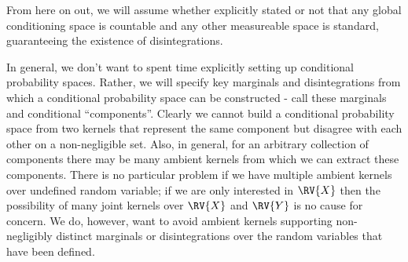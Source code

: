 From here on out, we will assume whether explicitly stated or not that any global conditioning space is countable and any other measureable space is standard, guaranteeing the existence of disintegrations.

In general, we don't want to spent time explicitly setting up conditional probability spaces. Rather, we will specify key marginals and disintegrations from which a conditional probability space can be constructed - call these marginals and conditional ``components''. Clearly we cannot build a conditional probability space from two kernels that represent the same component but disagree with each other on a non-negligible set. Also, in general, for an arbitrary collection of components there may be many ambient kernels from which we can extract these components. There is no particular problem if we have multiple ambient kernels over undefined random variable; if we are only interested in $\RV{X}$ then the possibility of many joint kernels over $\RV{X}$ and $\RV{Y}$ is no cause for concern. We do, however, want to avoid ambient kernels supporting non-negligibly distinct marginals or disintegrations over the random variables that have been defined. 

